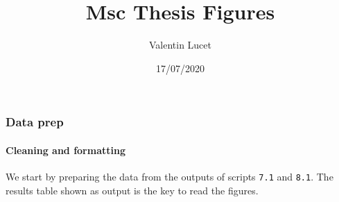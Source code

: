 \documentclass[
]{article}
\title{Msc Thesis Figures}
\author{Valentin Lucet}
\date{17/07/2020}
\begin{document}
\maketitle

{
\setcounter{tocdepth}{5}
\tableofcontents
}
\hypertarget{data-prep}{%
\subsubsection{Data prep}\label{data-prep}}

\hypertarget{cleaning-and-formatting}{%
\paragraph{Cleaning and formatting}\label{cleaning-and-formatting}}

We start by preparing the data from the outputs of scripts \texttt{7.1}
and \texttt{8.1}. The results table shown as output is the key to read
the figures.
\end{document}
